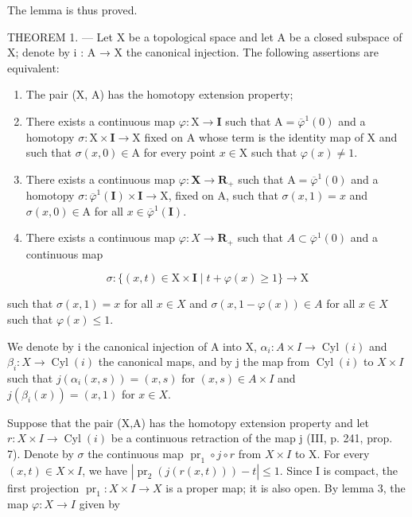 The lemma is thus proved.

THEOREM 1. --- Let X be a topological space and let A be a closed subspace of X; denote by i : A → X the canonical injection. The following assertions are equivalent:

\begin{enumerate}
\def\labelenumi{(\roman{enumi})}
\item
  The pair (X, A) has the homotopy extension property;
\item
  There exists a continuous map \(\varphi\colon\mathrm{X}\to\mathbf{I}\) such that \(\mathrm{A}=\overline{\varphi}^{1}(0)\) and a homotopy \(\sigma\colon\mathrm{X}\times\mathbf{I}\to\mathrm{X}\) fixed on A whose term is the identity map of X and such that \(\sigma(x,0)\in\mathrm{A}\) for every point \(x\in\mathrm{X}\) such that \(\varphi(x)\neq1\).
\item
  There exists a continuous map \(\varphi\colon\mathbf{X}\to\mathbf{R}_{+}\) such that \(\mathrm{A}=\overline{\varphi}^{1}(0)\) and a homotopy \(\sigma\colon\overline{\varphi}^{1}(\mathbf{I})\times\mathbf{I}\to\mathrm{X}\), fixed on A, such that \(\sigma(x,1)=x\) and \(\sigma(x,0)\in\mathrm{A}\) for all \(x\in\overline{\varphi}^{1}(\mathbf{I})\).
\item
  There exists a continuous map \(\varphi\colon X\to\mathbf{R}_{+}\) such that \(A\subset\overline{\varphi}^{1}(0)\) and a continuous map
\end{enumerate}

\[
\sigma \colon \{(x, t) \in \mathrm{X} \times \mathbf {I} \mid t + \varphi (x) \geqslant 1 \} \to \mathrm{X}
\]

such that \(\sigma(x,1) = x\) for all \(x \in X\) and \(\sigma(x,1 - \varphi(x)) \in A\) for all \(x \in X\) such that \(\varphi(x) \leqslant 1\).

We denote by i the canonical injection of A into X, \(\alpha_{i}\colon A\times I\to\operatorname{Cyl}(i)\) and \(\beta_{i}\colon X\to\operatorname{Cyl}(i)\) the canonical maps, and by j the map from \(\operatorname{Cyl}(i)\) to \(X\times I\) such that \(j(\alpha_{i}(x,s))=(x,s)\) for \((x,s)\in A\times I\) and \(j(\beta_{i}(x))=(x,1)\) for \(x\in X\).

Suppose that the pair (X,A) has the homotopy extension property and let \(r:X\times I\to\operatorname{Cyl}(i)\) be a continuous retraction of the map j (III, p. 241, prop. 7). Denote by \(\sigma\) the continuous map \(\operatorname{pr}_1\circ j\circ r\) from \(X\times I\) to X. For every \((x,t)\in X\times I\), we have \(|\operatorname{pr}_2(j(r(x,t)))-t|\leqslant1\). Since I is compact, the first projection \(\operatorname{pr}_1:X\times I\to X\) is a proper map; it is also open. By lemma 3, the map \(\varphi:X\to I\) given by


